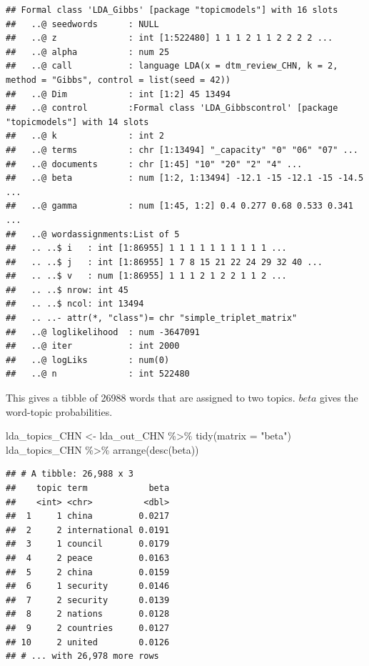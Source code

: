 \documentclass[
]{article}
\newenvironment{Shaded}{\begin{snugshade}}{\end{snugshade}}
\newcommand{\AttributeTok}[1]{\textcolor[rgb]{0.77,0.63,0.00}{#1}}
\newcommand{\FunctionTok}[1]{\textcolor[rgb]{0.00,0.00,0.00}{#1}}
\newcommand{\NormalTok}[1]{#1}
\newcommand{\OtherTok}[1]{\textcolor[rgb]{0.56,0.35,0.01}{#1}}
\newcommand{\SpecialCharTok}[1]{\textcolor[rgb]{0.00,0.00,0.00}{#1}}
\newcommand{\StringTok}[1]{\textcolor[rgb]{0.31,0.60,0.02}{#1}}
\begin{document}
\begin{verbatim}
## Formal class 'LDA_Gibbs' [package "topicmodels"] with 16 slots
##   ..@ seedwords      : NULL
##   ..@ z              : int [1:522480] 1 1 1 2 1 1 2 2 2 2 ...
##   ..@ alpha          : num 25
##   ..@ call           : language LDA(x = dtm_review_CHN, k = 2, method = "Gibbs", control = list(seed = 42))
##   ..@ Dim            : int [1:2] 45 13494
##   ..@ control        :Formal class 'LDA_Gibbscontrol' [package "topicmodels"] with 14 slots
##   ..@ k              : int 2
##   ..@ terms          : chr [1:13494] "_capacity" "0" "06" "07" ...
##   ..@ documents      : chr [1:45] "10" "20" "2" "4" ...
##   ..@ beta           : num [1:2, 1:13494] -12.1 -15 -12.1 -15 -14.5 ...
##   ..@ gamma          : num [1:45, 1:2] 0.4 0.277 0.68 0.533 0.341 ...
##   ..@ wordassignments:List of 5
##   .. ..$ i   : int [1:86955] 1 1 1 1 1 1 1 1 1 1 ...
##   .. ..$ j   : int [1:86955] 1 7 8 15 21 22 24 29 32 40 ...
##   .. ..$ v   : num [1:86955] 1 1 1 2 1 2 2 1 1 2 ...
##   .. ..$ nrow: int 45
##   .. ..$ ncol: int 13494
##   .. ..- attr(*, "class")= chr "simple_triplet_matrix"
##   ..@ loglikelihood  : num -3647091
##   ..@ iter           : int 2000
##   ..@ logLiks        : num(0) 
##   ..@ n              : int 522480
\end{verbatim}

This gives a tibble of 26988 words that are assigned to two topics.
\(beta\) gives the word-topic probabilities.

\begin{Shaded}
\begin{Highlighting}[]
\NormalTok{lda\_topics\_CHN }\OtherTok{\textless{}{-}}\NormalTok{ lda\_out\_CHN }\SpecialCharTok{\%\textgreater{}\%}  
 \FunctionTok{tidy}\NormalTok{(}\AttributeTok{matrix =} \StringTok{"beta"}\NormalTok{) }
\NormalTok{lda\_topics\_CHN }\SpecialCharTok{\%\textgreater{}\%}  
  \FunctionTok{arrange}\NormalTok{(}\FunctionTok{desc}\NormalTok{(beta))}
\end{Highlighting}
\end{Shaded}

\begin{verbatim}
## # A tibble: 26,988 x 3
##    topic term            beta
##    <int> <chr>          <dbl>
##  1     1 china         0.0217
##  2     2 international 0.0191
##  3     1 council       0.0179
##  4     2 peace         0.0163
##  5     2 china         0.0159
##  6     1 security      0.0146
##  7     2 security      0.0139
##  8     2 nations       0.0128
##  9     2 countries     0.0127
## 10     2 united        0.0126
## # ... with 26,978 more rows
\end{verbatim}
\end{document}
